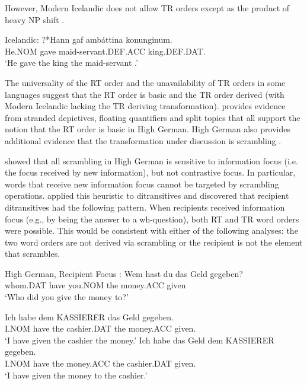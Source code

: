 	However, Modern Icelandic does not allow TR orders except as the product of heavy NP shift \citep{Dehe.2004}.
\pagebreak
\begin{exe}
	\ex Icelandic:\label{ex:ice-tr}
\gll ?*Hann gaf amb\'attina konunginum.\\
He.NOM gave maid-servant.DEF.ACC king.DEF.DAT. \\
\trans `He gave the king the maid-servant \citep[ex 14b]{Dehe.2004}.'
\end{exe}

The universality of the RT order and the unavailability of TR orders in some languages suggest that the RT order is basic and the TR order derived (with Modern Icelandic lacking the TR deriving transformation). \cite{Georgala.2011} provides evidence from stranded depictives, floating quantifiers and split topics that all support the notion that the RT order is basic in High German. High German also provides additional evidence that the transformation under discussion is scrambling \citep{Lenerz.1977,Abraham.1986,Webelhuth.1992,Choi.1996}.

\cite{Lenerz.1977} showed that all scrambling in High German is sensitive to information focus (i.e. the focus received by new information), but not contrastive focus. In particular, words that receive new information focus cannot be targeted by scrambling operations. \cite{Lenerz.1977} applied this heuristic to ditransitives and discovered that recipient ditransitives had the following pattern. When recipients received information focus (e.g., by being the answer to a wh-question), both RT and TR word orders were possible. This would be consistent with either of the following analyses: the two word orders are not derived via scrambling or the recipient is not the element that scrambles.

\begin{exe}
	\ex High German, Recipient Focus \citep{Choi.1996}:\label{ex:hg-rec-focus}
\gll Wem hast du das Geld gegeben?\\
whom.DAT have you.NOM the money.ACC given\\
\trans `Who did you give the money to?'
\begin{xlist}
\ex \gll Ich habe dem KASSIERER das Geld gegeben.\\
I.NOM have the cashier.DAT the money.ACC given.\\
\trans `I have given the cashier the money.'
\ex \gll Ich habe das Geld dem KASSIERER gegeben.\\
I.NOM have the money.ACC the cashier.DAT given.\\
\trans `I have given the money to the cashier.'
\end{xlist}
\end{exe}

